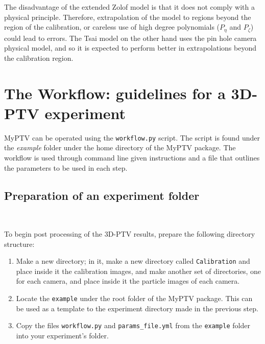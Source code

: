 \documentclass[10pt,a4paper]{article}
\begin{document}
The disadvantage of the extended Zolof model is that it does not comply with a physical principle. Therefore, extrapolation of the model to regions beyond the region of the calibration, or careless use of high degree polynomials ($P_\eta$ and $P_\zeta$) could lead to errors. The Tsai model on the other hand uses the pin hole camera physical model, and so it is expected to perform better in extrapolations beyond the calibration region.



















\clearpage



\section{The Workflow: guidelines for a 3D-PTV experiment}\label{sec:workflow}


MyPTV can be operated using the \texttt{workflow.py} script. The script is found under the \textit{example} folder under the home directory of the MyPTV package. The workflow is used through command line given instructions and a file that outlines the parameters to be used in each step.





\subsection{Preparation of an experiment folder}~\label{sec:workflow_exp_folder}

To begin post processing of the 3D-PTV results, prepare the following directory structure:

\begin{enumerate}
	\item Make a new directory; in it, make a new directory called \texttt{Calibration} and place inside it the calibration images, and make another set of directories, one for each camera, and place inside it the particle images of each camera.
	\item Locate the \texttt{example} under the root folder of the MyPTV package. This can be used as a template to the experiment directory made in the previous step.
	\item Copy the files \texttt{workflow.py} and \texttt{params\_file.yml} from the \texttt{example} folder into your experiment's folder.
\end{enumerate}
\end{document}

